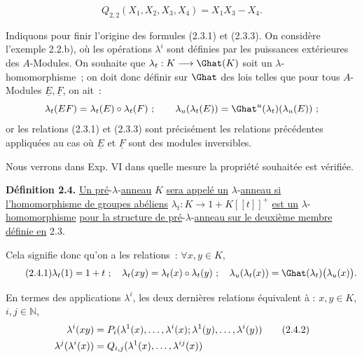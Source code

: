 
\[
  Q_{2,2}(X_1,X_2,X_3,X_4)=X_1X_3-X_4.
\]

Indiquons pour finir l'origine des formules (2.3.1) et (2.3.3). On considère l'exemple 2.2.b), où les opérations \(\lambda^i\) sont définies par les puissances extérieures des \(A\)-Modules. On souhaite que \(\lambda_t:K\longrightarrow\Ghat(K)\) soit un \(\lambda\)-homomorphisme~; on doit donc définir sur \(\Ghat\) des lois telles que pour tous \(A\)-Modules \(\underline{E},\underline{F}\), on ait~:
\[
  \lambda_t(EF)=\lambda_t(E)\circ\lambda_t(F)~;\qquad
  \lambda_u(\lambda_t(E))=\Ghat^u(\lambda_t)(\lambda_u(E))~;
\]
or les relations (2.3.1) et (2.3.3) sont précisément les relations précédentes appliquées au cas où \(\underline{E}\) et \(\underline{F}\) sont des modules inversibles.

Nous verrons dans Exp. VI dans quelle mesure la propriété souhaitée est vérifiée.

\textbf{Définition 2.4.} \uline{Un pré}-\(\lambda\)-\uline{anneau} \(K\) \uline{sera appelé un} \(\lambda\)-\uline{anneau si l'homomorphisme de groupes abéliens} \(\lambda_t:K\longrightarrow1+K[[t]]^+\) \uline{est un} \(\lambda\)-\uline{homomorphisme} \uline{pour la structure de pré}-\(\lambda\)-\uline{anneau sur le deuxième membre définie en} 2.3.

Cela signifie donc qu'on a les relations~: \(\forall x,y\in K\),
\begin{equation}\tag{2.4.1}
  \lambda_t(1)=1+t~;\quad
  \lambda_t(xy)=\lambda_t(x)\circ\lambda_t(y)~;\quad
  \lambda_u(\lambda_t(x))=\Ghat(\lambda_t)\bigl(\lambda_u(x)\bigr).
\end{equation}

En termes des applications \(\lambda^i\), les deux dernières relations équivalent à : \(x,y\in K\), \(i,j\in\mathbb N\),
\begin{align}
  \lambda^i(xy)
  &=P_i(\lambda^1(x),\ldots,\lambda^i(x);
       \lambda^1(y),\ldots,\lambda^i(y)) \tag{2.4.2}\\
  \lambda^j(\lambda^i(x))
  &=Q_{i,j}(\lambda^1(x),\ldots,\lambda^{ij}(x)) \notag
\end{align}

